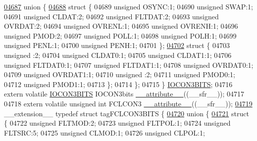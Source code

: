 \begin{DoxyCode}
\hypertarget{a00015_source_l04687}{}\hyperlink{a00015}{04687}   \textcolor{keyword}{union }\{
\hypertarget{a00015_source_l04688}{}\hyperlink{a00015}{04688}     \textcolor{keyword}{struct }\{
04689       \textcolor{keywordtype}{unsigned} OSYNC:1;
04690       \textcolor{keywordtype}{unsigned} SWAP:1;
04691       \textcolor{keywordtype}{unsigned} CLDAT:2;
04692       \textcolor{keywordtype}{unsigned} FLTDAT:2;
04693       \textcolor{keywordtype}{unsigned} OVRDAT:2;
04694       \textcolor{keywordtype}{unsigned} OVRENL:1;
04695       \textcolor{keywordtype}{unsigned} OVRENH:1;
04696       \textcolor{keywordtype}{unsigned} PMOD:2;
04697       \textcolor{keywordtype}{unsigned} POLL:1;
04698       \textcolor{keywordtype}{unsigned} POLH:1;
04699       \textcolor{keywordtype}{unsigned} PENL:1;
04700       \textcolor{keywordtype}{unsigned} PENH:1;
04701     \};
\hypertarget{a00015_source_l04702}{}\hyperlink{a00015}{04702}     \textcolor{keyword}{struct }\{
04703       \textcolor{keywordtype}{unsigned} :2;
04704       \textcolor{keywordtype}{unsigned} CLDAT0:1;
04705       \textcolor{keywordtype}{unsigned} CLDAT1:1;
04706       \textcolor{keywordtype}{unsigned} FLTDAT0:1;
04707       \textcolor{keywordtype}{unsigned} FLTDAT1:1;
04708       \textcolor{keywordtype}{unsigned} OVRDAT0:1;
04709       \textcolor{keywordtype}{unsigned} OVRDAT1:1;
04710       \textcolor{keywordtype}{unsigned} :2;
04711       \textcolor{keywordtype}{unsigned} PMOD0:1;
04712       \textcolor{keywordtype}{unsigned} PMOD1:1;
04713     \};
04714   \};
04715 \} \hyperlink{a00014_d4/d40/a00516}{IOCON3BITS};
04716 \textcolor{keyword}{extern} \textcolor{keyword}{volatile} \hyperlink{a00014_d4/d40/a00516}{IOCON3BITS} IOCON3bits \hyperlink{a00015_a493c46f03454991ccc5aa7a6e1dfb2a7}{\_\_attribute\_\_}((\_\_sfr\_\_));
04717 
04718 \textcolor{keyword}{extern} \textcolor{keyword}{volatile} \textcolor{keywordtype}{unsigned} \textcolor{keywordtype}{int}  FCLCON3 \hyperlink{a00015_a493c46f03454991ccc5aa7a6e1dfb2a7}{\_\_attribute\_\_}((\_\_sfr\_\_));
\hypertarget{a00015_source_l04719}{}\hyperlink{a00014}{04719} \_\_extension\_\_ \textcolor{keyword}{typedef} \textcolor{keyword}{struct }tagFCLCON3BITS \{
\hypertarget{a00015_source_l04720}{}\hyperlink{a00015}{04720}   \textcolor{keyword}{union }\{
\hypertarget{a00015_source_l04721}{}\hyperlink{a00015}{04721}     \textcolor{keyword}{struct }\{
04722       \textcolor{keywordtype}{unsigned} FLTMOD:2;
04723       \textcolor{keywordtype}{unsigned} FLTPOL:1;
04724       \textcolor{keywordtype}{unsigned} FLTSRC:5;
04725       \textcolor{keywordtype}{unsigned} CLMOD:1;
04726       \textcolor{keywordtype}{unsigned} CLPOL:1;

\end{DoxyCode}
